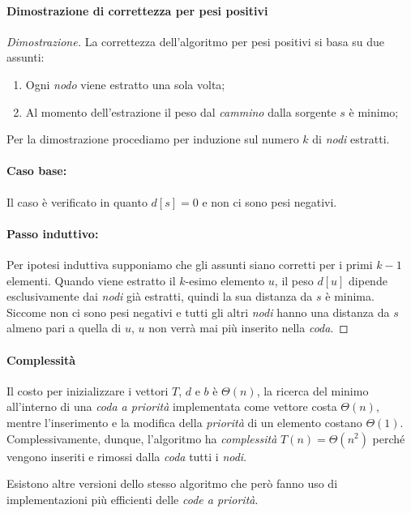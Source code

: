 \paragraph{Dimostrazione di correttezza per pesi positivi}
\begin{proof}[Dimostrazione]
    La correttezza dell'algoritmo per pesi positivi si basa su due assunti:
    \begin{enumerate}
        \item Ogni \emph{nodo} viene estratto una sola volta;
        \item Al momento dell'estrazione il peso dal \emph{cammino} dalla
        sorgente $s$ è minimo;
    \end{enumerate}
    Per la dimostrazione procediamo per induzione sul numero $k$ di \emph{nodi}
    estratti.

    \paragraph{Caso base: }
    Il caso è verificato in quanto $d[s]=0$ e non ci sono pesi negativi.

    \paragraph{Passo induttivo: }
    Per ipotesi induttiva supponiamo che gli assunti siano corretti per i primi
    $k-1$ elementi. Quando viene estratto il $k$-esimo elemento $u$, il peso
    $d[u]$ dipende esclusivamente dai \emph{nodi} già estratti, quindi la sua
    distanza da $s$ è minima. Siccome non ci sono pesi negativi e tutti gli
    altri \emph{nodi} hanno una distanza da $s$ almeno pari a quella di $u$,
    $u$ non verrà mai più inserito nella \emph{coda}.
\end{proof}

\paragraph{Complessità}
Il costo per inizializzare i vettori $T$, $d$ e $b$ è $\Theta(n)$, la ricerca
del minimo all'interno di una \emph{coda a priorità} implementata come vettore
costa $\Theta(n)$, mentre l'inserimento e la modifica della \emph{priorità} di
un elemento costano $\Theta(1)$. Complessivamente, dunque, l'algoritmo ha
\emph{complessità} $T(n)=\Theta(n^2)$ perché vengono inseriti e rimossi dalla
\emph{coda} tutti i \emph{nodi}.

Esistono altre versioni dello stesso algoritmo che però fanno uso di
implementazioni più efficienti delle \emph{code a priorità}.

